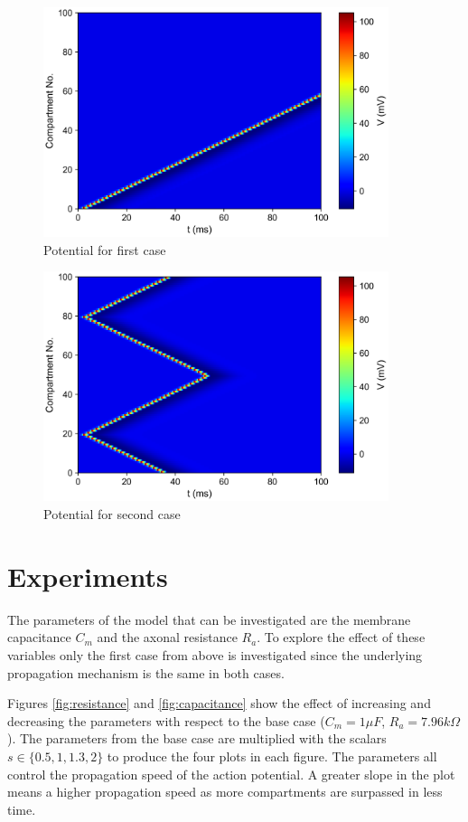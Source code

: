 \documentclass{scrartcl}
\begin{document}
\begin{figure}
	\centering
	\includegraphics[width=0.9\textwidth]{figures/potential_case1.png}
	\caption{Potential for first case}
	\label{fig:1}
\end{figure}
\begin{figure}
	\centering
	\includegraphics[width=0.9\textwidth]{figures/potential_case2.png}
	\caption{Potential for second case}
	\label{fig:2}
\end{figure}

\newpage
\section{Experiments}

The parameters of the model that can be investigated are the membrane capacitance $C_m$ and the axonal resistance $R_a$. To explore the effect of these variables only the first case from above is investigated since the underlying propagation mechanism is the same in both cases. 

Figures \ref{fig:resistance} and \ref{fig:capacitance} show the effect of increasing and decreasing the parameters with respect to the base case ($C_m=1 \mu F$, $R_a = 7.96k\Omega$). The parameters from the base case are multiplied with the scalars $s \in \{0.5, 1, 1.3, 2\}$ to produce the four plots in each figure. The parameters all control the propagation speed of the action potential. A greater slope in the plot means a higher propagation speed as more compartments are surpassed in less time. 
\end{document}
